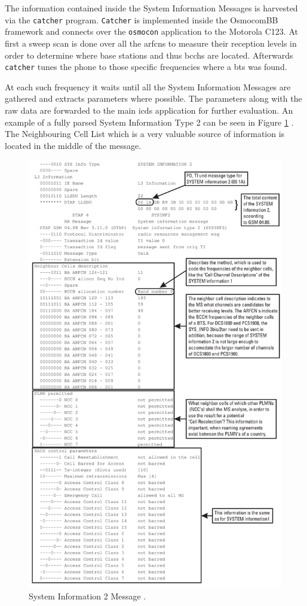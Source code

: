 The information contained inside the System Information Messages is harvested via the \texttt{catcher} program.
\texttt{Catcher} is implemented inside the OsmocomBB framework and connects over the \texttt{osmocon} application to the Motorola C123.
At first a sweep scan is done over all the \glspl{arfcn} to measure their reception levels in order to determine where base stations and thus \glspl{bcch} are located.
Afterwards \texttt{catcher} tunes the phone to those specific frequencies where a \gls{bts} was found.

At each such frequency it waits until all the System Information Messages are gathered and extracts parameters where possible.
The parameters along with the raw data are forwarded to the main \gls{icds} application for further evaluation.
An example of a fully parsed System Information Type 2 can be seen in Figure \ref{fig:si1} \cite{protocols1999}.
The Neighbouring Cell List which is a very valuable source of information is located in the middle of the message.
\begin{figure}
\centering
\includegraphics[width=.9\textwidth]{../Images/sysinfo2}
\caption{System Information 2 Message \cite{protocols1999}.}
\label{fig:si1}
\end{figure}
